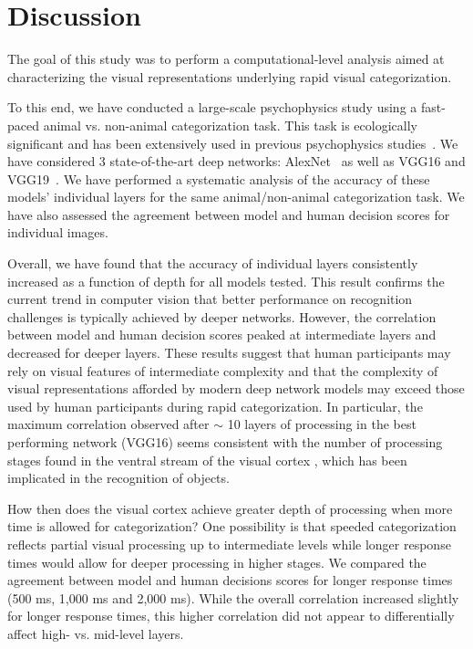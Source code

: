 \documentclass{article}
\begin{document}
\enlargethispage{5mm}


\section{Discussion}


The goal of this study was to perform a computational-level analysis aimed at characterizing the visual representations underlying rapid visual categorization. 


To this end, we have conducted a large-scale psychophysics study using a fast-paced animal vs. non-animal categorization task. This task is ecologically significant and has been extensively used in previous psychophysics studies~\citep[reviewed in][]{Fabre-Thorpe2011}. We have considered 3 state-of-the-art deep networks: AlexNet~\citep{Krizhevsky2012} as well as VGG16 and VGG19~\citep{Simonyan2014a}. We have performed a systematic analysis of the accuracy of these models' individual layers for the same animal/non-animal categorization task. We have also assessed the agreement between model and human decision scores for individual images. 


Overall, we have found that the accuracy of individual layers consistently increased as a function of depth for all models tested. This result confirms the current trend in computer vision that better performance on recognition challenges is typically achieved by deeper networks. However, the correlation between model and human decision scores peaked at intermediate layers and decreased for deeper layers. These results suggest that human participants may rely on visual features of intermediate complexity and that the complexity of visual representations afforded by modern deep network models may exceed those used by human participants during rapid categorization. In particular, the maximum correlation observed after $\sim$ 10 layers of processing in the best performing network (VGG16) seems consistent with the number of processing stages found in the ventral stream of the visual cortex \cite{Serre2007}, which has been implicated in the recognition of objects. 


How then does the visual cortex achieve greater depth of processing when more time is allowed for categorization? One possibility is that speeded categorization reflects partial visual processing up to intermediate levels while longer response times would allow for deeper processing in higher stages. We compared the agreement between model and human decisions scores for longer response times (500 ms, 1,000 ms and 2,000 ms).  While the overall correlation increased slightly for longer response times, this higher correlation did not appear to differentially affect  high- vs. mid-level layers. 
\end{document}
